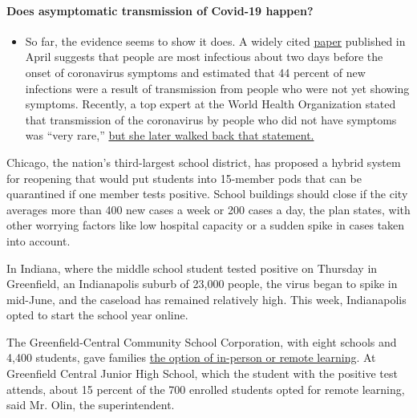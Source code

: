 \begin{itemize}
{  \paragraph{Does asymptomatic transmission of Covid-19
  happen?}\label{does-asymptomatic-transmission-of-covid-19-happen}}

  \begin{itemize}
  \tightlist
  \item
    So far, the evidence seems to show it does. A widely cited
    \href{https://www.nature.com/articles/s41591-020-0869-5}{paper}
    published in April suggests that people are most infectious about
    two days before the onset of coronavirus symptoms and estimated that
    44 percent of new infections were a result of transmission from
    people who were not yet showing symptoms. Recently, a top expert at
    the World Health Organization stated that transmission of the
    coronavirus by people who did not have symptoms was ``very rare,''
    \href{https://www.nytimes.com/2020/06/09/world/coronavirus-updates.html?action=click\&pgtype=Article\&state=default\&region=MAIN_CONTENT_3\&context=storylines_faq\#link-1f302e21}{but
    she later walked back that statement.}
  \end{itemize}
\end{itemize}

Chicago, the nation's third-largest school district, has proposed a
hybrid system for reopening that would put students into 15-member pods
that can be quarantined if one member tests positive. School buildings
should close if the city averages more than 400 new cases a week or 200
cases a day, the plan states, with other worrying factors like low
hospital capacity or a sudden spike in cases taken into account.

In Indiana, where the middle school student tested positive on Thursday
in Greenfield, an Indianapolis suburb of 23,000 people, the virus began
to spike in mid-June, and the caseload has remained relatively high.
This week, Indianapolis opted to start the school year online.

The Greenfield-Central Community School Corporation, with eight schools
and 4,400 students, gave families
\href{https://www.gcsc.k12.in.us/wp-content/uploads/2020/07/Greenfield-Central-School-Opening-Procedures-Final-7-8-2020.pdf}{the
option of in-person or remote learning}. At Greenfield Central Junior
High School, which the student with the positive test attends, about 15
percent of the 700 enrolled students opted for remote learning, said Mr.
Olin, the superintendent.

